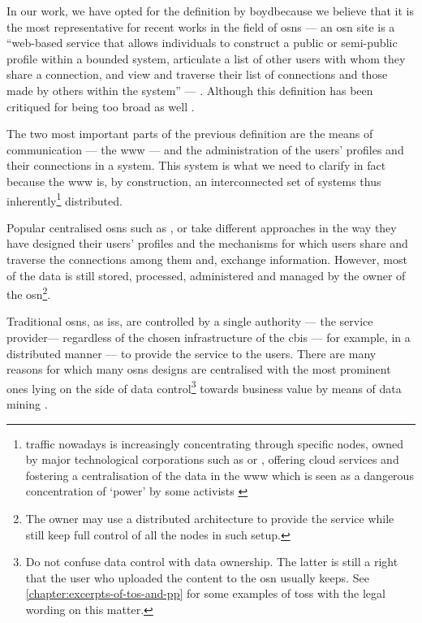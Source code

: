 \documentclass[showtrims,oldfontcommands]{kthesis}
\begin{document}
In our work, we have opted for the definition by boyd\etal because we believe that 
it is the most representative for recent works in the field of \acp{osn} --- an 
\ac{osn} site is a ``web-based service that allows individuals to construct a public 
or semi-public profile within a bounded system, articulate a list of other users 
with whom they share a connection, and view and traverse their list of connections 
and those made by others within the system'' --- \cite{boydE07}. Although this definition 
has been critiqued for being too broad as well \cite{Beer08}.

The two most important parts of the previous definition are the means of communication 
--- the \ac{www} --- and the administration of the users' profiles and their connections 
in a system. This system is what we need to clarify in fact because the \ac{www} 
is, by construction, an interconnected set of systems thus inherently\footnote{
\Internet traffic nowadays is increasingly concentrating through specific nodes, 
owned by major technological corporations such as \Amazon or \Google, offering cloud 
services and fostering a centralisation of the data in the \ac{www} which is seen 
as a dangerous concentration of `power' by some activists \cite{Bolychevsky13}} 
distributed.

Popular centralised \acp{osn} such as \Facebook, \Twitter or \GooglePlus take different 
approaches in the way they have designed their users' profiles and the mechanisms 
for which users share and traverse the connections among them and, exchange information. 
However, most of the data is still stored, processed, administered and managed by 
the owner of the \ac{osn}\footnote{The owner may use a distributed architecture 
to provide the service while still keep full control of all the nodes in such setup.}.

Traditional \acp{osn}, as \acp{is}, are controlled by a single authority --- the 
service provider--- regardless of the chosen infrastructure of the \ac{cbis} --- 
for example, in a distributed manner --- to provide the service to the users. There 
are many reasons for which many \acp{osn} designs are centralised with the most 
prominent ones lying on the side of data control\footnote{Do not confuse data control 
with data ownership. The latter is still a right that the user who uploaded the content 
to the \ac{osn} usually keeps. See \cref{chapter:excerpts-of-tos-and-pp} for some 
examples of \acp{tos} with the legal wording on this matter.} towards business value 
by means of data mining \cite{DomingosR01}.
\end{document}
